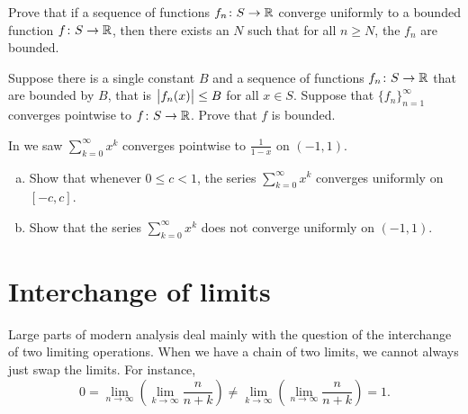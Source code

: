 \begin{exercise}
Prove that
if a sequence of functions $f_n \colon S \to {\mathbb{R}}$
converge uniformly to a bounded function $f \colon S \to {\mathbb{R}}$,
then there exists an $N$ such that for all $n \geq N$, the $f_n$
are bounded.
\end{exercise}

\begin{exercise}
Suppose there is a single constant $B$ and
a sequence of functions
$f_n \colon S \to {\mathbb{R}}$ that are bounded by $B$,
that is $\bigl\lvert {f_n(x)} \bigr\rvert \leq B$ for all $x \in S$.
Suppose that $\{ f_n \}_{n=1}^\infty$ converges pointwise
to $f \colon S \to {\mathbb{R}}$.
Prove that $f$ is bounded.
\end{exercise}

\begin{exercise}
In  we saw
$\sum_{k=0}^\infty x^k$ converges pointwise to $\frac{1}{1-x}$ on
$(-1,1)$.
\begin{enumerate}[a)]
\item
Show that whenever $0 \leq c < 1$, the series
$\sum_{k=0}^\infty x^k$ converges uniformly on $[-c,c]$.
\item
Show that the series $\sum_{k=0}^\infty x^k$ does not converge uniformly
on $(-1,1)$.
\end{enumerate}
\end{exercise}


\sectionnewpage
\section{Interchange of limits}
\label{sec:liminter}



Large parts of modern analysis deal mainly with the question of the
interchange of two limiting operations.  When
we have a chain of two limits, we cannot always just swap the limits.
For instance,
\begin{equation*}
0 = 
\lim_{n\to\infty}
\left(
\lim_{k\to\infty}
\frac{n}{n + k}
\right)
\neq
\lim_{k\to\infty}
\left(
\lim_{n\to\infty}
\frac{n}{n + k}
\right)
= 1 .
\end{equation*}

